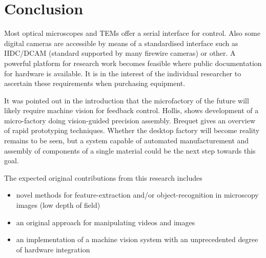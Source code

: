 \documentclass[a4paper,12pt]{book}
\begin{document}


\chapter{Conclusion}
Most optical microscopes and TEMs offer a serial interface for control.
Also some digital cameras are accessible by means of a standardised interface
such as IIDC/DCAM (standard supported by many firewire cameras) or other.
A powerful platform for research work becomes feasible where public
documentation for hardware is available. It is in the interest of the
individual researcher to ascertain these requirements when purchasing
equipment.

It was pointed out in the introduction  that the microfactory of the
future will likely require machine vision for feedback control.
Hollis\cite{RefWorks:154},\cite{RefWorks:155} shows development of a
micro-factory doing vision-guided precision assembly.
Brequet\cite{RefWorks:262} gives an overview of rapid prototyping techniques.
Whether the desktop factory will become reality remains to be seen, but a
system capable of automated manufacturement and assembly of components of
a single material could be the next step towards this goal.

The expected original contributions from this research includes
\begin{itemize}
\item novel methods for feature-extraction and/or object-recognition in
  microscopy images (low depth of field)
\item an original approach for manipulating videos and images
\item an implementation of a machine vision system with an unprecedented
  degree of hardware integration
\end{itemize}

\end{document}

